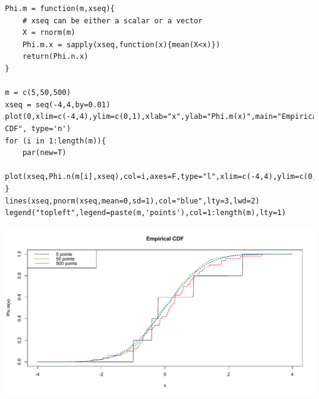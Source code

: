 \documentclass[letter,10.5pt]{article}
\numberwithin{equation}{subsection}
\begin{document}
\begin{boxedminipage}{\textwidth}
\scriptsize
\begin{verbatim}
Phi.m = function(m,xseq){
	# xseq can be either a scalar or a vector
	X = rnorm(m)
	Phi.m.x = sapply(xseq,function(x){mean(X<x)})
	return(Phi.n.x)
}

m = c(5,50,500)
xseq = seq(-4,4,by=0.01)
plot(0,xlim=c(-4,4),ylim=c(0,1),xlab="x",ylab="Phi.m(x)",main="Empirical CDF", type='n')
for (i in 1:length(m)){
	par(new=T)
	plot(xseq,Phi.n(m[i],xseq),col=i,axes=F,type="l",xlim=c(-4,4),ylim=c(0,1),xlab="",ylab="")
}
lines(xseq,pnorm(xseq,mean=0,sd=1),col="blue",lty=3,lwd=2)
legend("topleft",legend=paste(m,'points'),col=1:length(m),lty=1)
\end{verbatim}
\end{boxedminipage}
\begin{center}
\includegraphics[scale=0.4]{2cdf.pdf}
\end{center}
\end{document}
